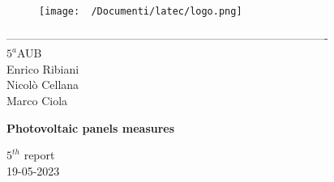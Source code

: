 \documentclass[12pt]{article}
\begin{document}
\begin{titlepage}
	\begin{center}
		\begin{figure}
			\centering
			\texttt{[image: ~/Documenti/latec/logo.png]}
			\label{fig:logo}
		\end{figure}
		-------------------------------------------------------------------------------------\\
		\vspace{2\baselineskip}
		\large $5^a$AUB\\
		\large Enrico Ribiani\\
		\large Nicolò Cellana\\
		\large Marco Ciola\\


		\vfill

		\Huge{\textbf{Photovoltaic panels measures}}\\
		\vfill

		\LARGE{$5^{th}$ report}\\
		\vfill
		\large{19-05-2023}
	\end{center}
\end{titlepage}
\tableofcontents
\newpage
{}
\setcounter{page}{1}
\end{document}
